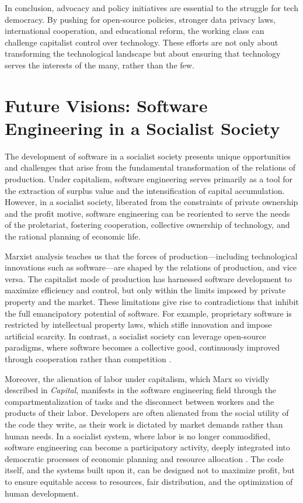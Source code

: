 \begin{refsection}
In conclusion, advocacy and policy initiatives are essential to the struggle for tech democracy. By pushing for open-source policies, stronger data privacy laws, international cooperation, and educational reform, the working class can challenge capitalist control over technology. These efforts are not only about transforming the technological landscape but about ensuring that technology serves the interests of the many, rather than the few.

\section{Future Visions: Software Engineering in a Socialist Society}

The development of software in a socialist society presents unique opportunities and challenges that arise from the fundamental transformation of the relations of production. Under capitalism, software engineering serves primarily as a tool for the extraction of surplus value and the intensification of capital accumulation. However, in a socialist society, liberated from the constraints of private ownership and the profit motive, software engineering can be reoriented to serve the needs of the proletariat, fostering cooperation, collective ownership of technology, and the rational planning of economic life.

Marxist analysis teaches us that the forces of production—including technological innovations such as software—are shaped by the relations of production, and vice versa. The capitalist mode of production has harnessed software development to maximize efficiency and control, but only within the limits imposed by private property and the market. These limitations give rise to contradictions that inhibit the full emancipatory potential of software. For example, proprietary software is restricted by intellectual property laws, which stifle innovation and impose artificial scarcity. In contrast, a socialist society can leverage open-source paradigms, where software becomes a collective good, continuously improved through cooperation rather than competition \cite[pp.~115-118]{marx1867}.

Moreover, the alienation of labor under capitalism, which Marx so vividly described in \textit{Capital}, manifests in the software engineering field through the compartmentalization of tasks and the disconnect between workers and the products of their labor. Developers are often alienated from the social utility of the code they write, as their work is dictated by market demands rather than human needs. In a socialist system, where labor is no longer commodified, software engineering can become a participatory activity, deeply integrated into democratic processes of economic planning and resource allocation \cite[pp.~387-389]{engels1845}. The code itself, and the systems built upon it, can be designed not to maximize profit, but to ensure equitable access to resources, fair distribution, and the optimization of human development.


\end{refsection}
